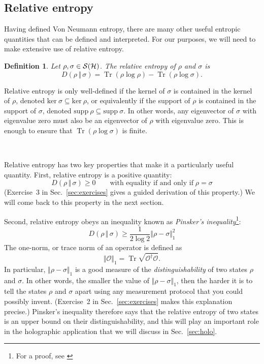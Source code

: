 \documentclass[a4paper,11pt]{article}
\newtheorem{defn}[thm]{Definition}
\newcommand{\Sec}[1]{Sec.~\ref{#1}}
\DeclareMathOperator{\Tr}{Tr}
\newcommand{\rent}[2]{D( #1 \, \Vert \, #2 )}
\newcommand{\Hil}{{\cal H}}
\newcommand{\Oh}{{\mathcal{O}}}
\newcommand{\mrm}[1]{\mathrm{#1}}
\newcommand{\Note}{\noindent {\bf Note:~}}
\begin{document}
\subsection{Relative entropy}
\label{subsec:relent}

Having defined Von Neumann entropy, there are many other useful entropic quantities that can be defined and interpreted.
For our purposes, we will need to make extensive use of relative entropy.

\begin{defn}
Let $\rho, \sigma \in \mathcal{S}(\Hil)$.
The \emph{relative entropy} of $\rho$ and $\sigma$ is
\begin{equation}
\rent{\rho}{\sigma} = \Tr(\rho \log \rho) - \Tr(\rho \log \sigma).
\end{equation}
\end{defn}
\Note Relative entropy is only well-defined if the kernel of $\sigma$ is contained in the kernel of $\rho$, denoted $\mrm{ker}~\sigma \subseteq \mrm{ker}~\rho$, or equivalently if the support of $\rho$ is contained in the support of $\sigma$, denoted $\mrm{supp}~\rho \subseteq \mrm{supp}~\sigma$.
In other words, any eigenvector of $\sigma$ with eigenvalue zero must also be an eigenvector of $\rho$ with eigenvalue zero.
This is enough to ensure that $\Tr(\rho \log \sigma)$ is finite.

~

Relative entropy has two key properties that make it a particularly useful quantity.
First, relative entropy is a positive quantity:
\begin{equation}
\rent{\rho}{\sigma} \geq 0 \qquad \text{with equality if and only if} \; \rho = \sigma
\end{equation}
(Exercise~3 in \Sec{sec:exercises} gives a guided derivation of this property.)
We will come back to this property in the next section.

Second, relative entropy obeys an inequality known as \emph{Pinsker's inequality}\footnote{For a proof, see \cite[Chap.~10.8]{Wilde:2011npi}}:
\begin{equation} \label{eq:Pinsker}
\rent{\rho}{\sigma} \geq \frac{1}{2 \log 2} \Vert \rho - \sigma \Vert_1^2
\end{equation}
The one-norm, or trace norm of an operator is defined as
\begin{equation}
\Vert \Oh \Vert_1 = \Tr \sqrt{\Oh^\dagger \Oh}.
\end{equation}
In particular, $\Vert \rho - \sigma \Vert_1$ is a good measure of the \emph{distinguishability} of two states $\rho$ and $\sigma$.
In other words, the smaller the value of $\Vert \rho - \sigma \Vert_1$, then the harder it is to tell the states $\rho$ and $\sigma$ apart using any measurement protocol that you could possibly invent.
(Exercise~2 in \Sec{sec:exercises} makes this explanation precise.)
Pinsker's inequality therefore says that the relative entropy of two states is an upper bound on their distinguishability, and this will play an important role in the holographic application that we will discuss in \Sec{sec:holo}.
\end{document}
